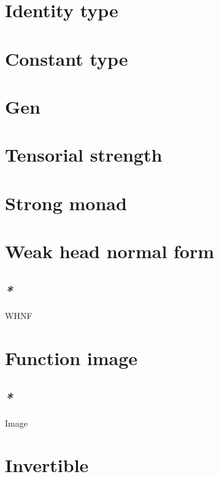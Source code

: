 \documentclass[a4paper,14pt,oneside]{book}
\begin{document}
\chapter{\label{org1c85633}Identity type}
\label{sec:org3b9da4c}

\chapter{\label{org6e427d1}Constant type}
\label{sec:org8a53984}

\chapter{\label{orgba9208b}Gen}
\label{sec:orga59c3a9}


\chapter{\label{org79e6f40}Tensorial strength}
\label{sec:org70573ef}

\chapter{\label{org21e0de8}Strong monad}
\label{sec:org14830db}

\chapter{\label{org35c1ed7}Weak head normal form}
\label{sec:org087c234}

\section{\emph{*}}
\label{sec:org22b839e}

\label{org9c963cc}WHNF\\

\chapter{\label{org0ba8fc8}Function image}
\label{sec:orga1a2618}

\section{\emph{*}}
\label{sec:org59064bb}

\label{orgba6b825}Image\\

\chapter{\label{orgc678f36}Invertible}
\label{sec:org93d9be8}
\end{document}
